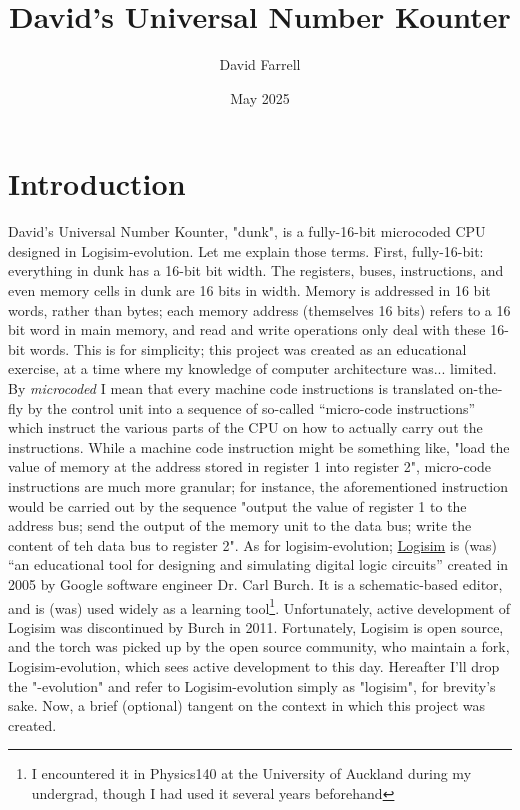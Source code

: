 \documentclass{article}
\title{David's Universal Number Kounter}
\author{David Farrell}
\date{May 2025}
\begin{document}
\maketitle

\section{Introduction}

David's Universal Number Kounter, "dunk", is a fully-16-bit microcoded CPU designed in Logisim-evolution. Let me explain those terms. First, fully-16-bit: everything in dunk has a 16-bit bit width. The registers, buses, instructions, and even memory cells in dunk are 16 bits in width. Memory is addressed in 16 bit words, rather than bytes; each memory address (themselves 16 bits) refers to a 16 bit word in main memory, and read and write operations only deal with these 16-bit words. This is for simplicity; this project was created as an educational exercise, at a time where my knowledge of computer architecture was... limited. By \textit{microcoded} I mean that every machine code instructions is translated on-the-fly by the control unit into a sequence of so-called ``micro-code instructions'' which instruct the various parts of the CPU on how to actually carry out the instructions. While a machine code instruction might be something like, "load the value of memory at the address stored in register 1 into register 2", micro-code instructions are much more granular; for instance, the aforementioned instruction would be carried out by the sequence "output the value of register 1 to the address bus; send the output of the memory unit to the data bus; write the content of teh data bus to register 2". As for logisim-evolution; \href{https://cburch.com/logisim/docs/2.0b17/index.html}{Logisim} is (was) ``an educational tool for designing and simulating digital logic circuits'' created in 2005 by Google software engineer Dr. Carl Burch. It is a schematic-based editor, and is (was) used widely as a learning tool\footnote{I encountered it in Physics140 at the University of Auckland during my undergrad, though I had used it several years beforehand}. Unfortunately, active development of Logisim was discontinued by Burch in 2011. Fortunately, Logisim is open source, and the torch was picked up by the open source community, who maintain a fork, Logisim-evolution, which sees active development to this day. Hereafter I'll drop the "-evolution" and refer to Logisim-evolution simply as "logisim", for brevity's sake. Now, a brief (optional) tangent on the context in which this project was created.
\end{document}
